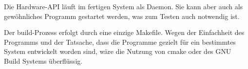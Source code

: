 Die Hardware-API läuft im fertigen System als Daemon.
Sie kann aber auch als gewöhnliches Programm gestartet werden, was zum Testen auch notwendig ist.

Der build-Prozess erfolgt durch eine einzige Makefile.
Wegen der Einfachheit des Programms und der Tatsache, dass die Programme gezielt für ein bestimmtes
System entwickelt worden sind, wäre die Nutzung von cmake oder des GNU Build Systems überflüssig.

